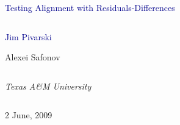 \documentclass[compress]{beamer}
\begin{document}
\begin{frame}
\vfill
\begin{center}
\textcolor{darkblue}{\Large Testing Alignment with Residuals-Differences}

\vfill
\begin{columns}
\begin{center}
\large
\textcolor{darkblue}{Jim Pivarski}

\vspace{0.2 cm}
Alexei Safonov
\end{center}
\end{columns}

\begin{columns}
\begin{center}
\scriptsize
{\it Texas A\&M University}
\end{center}
\end{columns}

\vfill
 2 June, 2009

\end{center}
\end{frame}


\small
\end{document}
